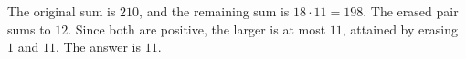 The original sum is $210$, and the remaining sum is $18\cdot11=198$. The erased pair sums to $12$. Since both are positive, the larger is at most $11$, attained by erasing $1$ and $11$. The answer is $\boxed{11}$.
